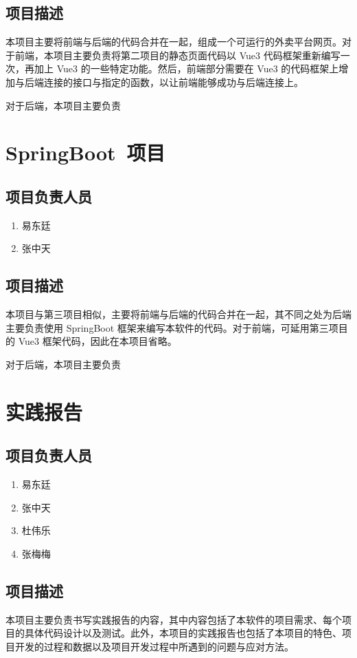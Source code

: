 \subsection{项目描述}
本项目主要将前端与后端的代码合并在一起，组成一个可运行的外卖平台网页。对于前端，本项目主要负责将第二项目的静态页面代码以 Vue3 代码框架重新编写一次，再加上 Vue3 的一些特定功能。然后，前端部分需要在 Vue3 的代码框架上增加与后端连接的接口与指定的函数，以让前端能够成功与后端连接上。

对于后端，本项目主要负责

\section{SpringBoot~项目}
\subsection{项目负责人员}
\begin{enumerate}
    \item{易东廷}
    \item{张中天}
\end{enumerate}
\subsection{项目描述}
本项目与第三项目相似，主要将前端与后端的代码合并在一起，其不同之处为后端主要负责使用 SpringBoot 框架来编写本软件的代码。对于前端，可延用第三项目的 Vue3 框架代码，因此在本项目省略。

对于后端，本项目主要负责

\section{实践报告}
\subsection{项目负责人员}
\begin{enumerate}
    \item{易东廷}
    \item{张中天}
    \item{杜伟乐}
    \item{张梅梅}
\end{enumerate}
\subsection{项目描述}
本项目主要负责书写实践报告的内容，其中内容包括了本软件的项目需求、每个项目的具体代码设计以及测试。此外，本项目的实践报告也包括了本项目的特色、项目开发的过程和数据以及项目开发过程中所遇到的问题与应对方法。